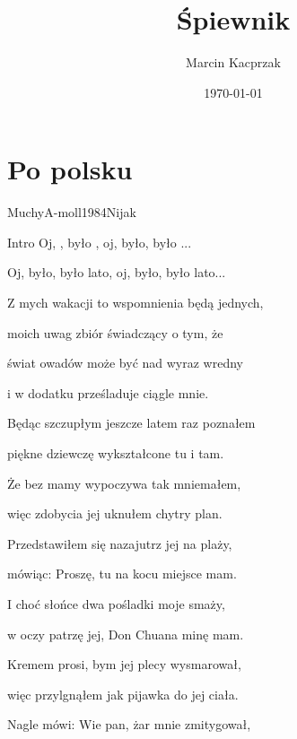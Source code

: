 \documentclass[a4paper,draft]{book}
\begin{document}

\title{\Huge Śpiewnik}
\author{Marcin Kacprzak}
\date{\today}

\maketitle
\tableofcontents

\chapter{Po polsku}
\begin{song}{Muchy}{A-moll}{1984}{Nijak}{}{}
	
	\begin{SBBracket}{Intro}
	Oj, , było , oj, było, było ...

	Oj, było, było lato, oj, było, było lato...
	\end{SBBracket}

	\begin{SBVerse}
	Z mych wakacji to wspomnienia będą jednych,

	moich uwag zbiór świadczący o tym, że

	świat owadów może być nad wyraz wredny

	i w dodatku prześladuje ciągle mnie.
	\end{SBVerse}
	\begin{SBVerse}
	Będąc szczupłym jeszcze latem raz poznałem

	piękne dziewczę wykształcone tu i tam.

	Że bez mamy wypoczywa tak mniemałem,

	więc zdobycia jej uknułem chytry plan.
	\end{SBVerse}
	\begin{SBVerse}
	Przedstawiłem się nazajutrz jej na plaży,

	mówiąc: Proszę, tu na kocu miejsce mam.

	I choć słońce dwa pośladki moje smaży,

	w oczy patrzę jej, Don Chuana minę mam.
	\end{SBVerse}
	\begin{SBVerse}
	Kremem prosi, bym jej plecy wysmarował,

	więc przylgnąłem jak pijawka do jej ciała.

	Nagle mówi: Wie pan, żar mnie zmitygował,


\end{SBVerse}
\end{song}
\end{document}
